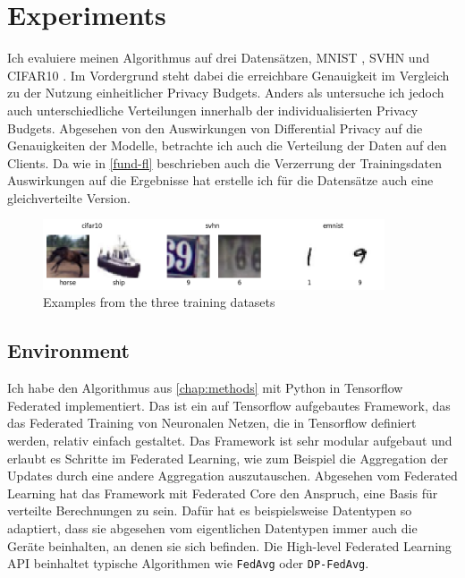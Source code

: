 \chapter{Experiments}\label{chap:experiments}

Ich evaluiere meinen Algorithmus auf drei Datensätzen, MNIST \cite{lecun:1998}, SVHN \cite{netzer:2011} und CIFAR10 \cite{krizhevsky:2009}. Im Vordergrund steht dabei die erreichbare Genauigkeit im Vergleich zu der Nutzung einheitlicher Privacy Budgets. Anders als \textcite{aldaghri:2023} untersuche ich jedoch auch unterschiedliche Verteilungen innerhalb der individualisierten Privacy Budgets. Abgesehen von den Auswirkungen von Differential Privacy auf die Genauigkeiten der Modelle, betrachte ich auch die Verteilung der Daten auf den Clients. Da wie in \autoref{fund-fl} beschrieben auch die Verzerrung der Trainingsdaten Auswirkungen auf die Ergebnisse hat erstelle ich für die Datensätze auch eine gleichverteilte Version.

\begin{figure}[h]
	\centering
	\includegraphics[width=0.9\textwidth]{Bilder/dataset_examples.png}
	\caption{Examples from the three training datasets}
	\label{fig:dataset-examples}
\end{figure}

\section{Environment}
Ich habe den Algorithmus aus \autoref{chap:methods} mit Python in Tensorflow Federated implementiert. Das ist ein auf Tensorflow aufgebautes Framework, das das Federated Training von Neuronalen Netzen, die in Tensorflow definiert werden, relativ einfach gestaltet. Das Framework ist sehr modular aufgebaut und erlaubt es Schritte im Federated Learning, wie zum Beispiel die Aggregation der Updates durch eine andere Aggregation auszutauschen. Abgesehen vom Federated Learning hat das Framework mit Federated Core den Anspruch, eine Basis für verteilte Berechnungen zu sein. Dafür hat es beispielsweise Datentypen so adaptiert, dass sie abgesehen vom eigentlichen Datentypen immer auch die Geräte beinhalten, an denen sie sich befinden. Die High-level Federated Learning API beinhaltet typische Algorithmen wie \texttt{FedAvg} oder \texttt{DP-FedAvg}.

